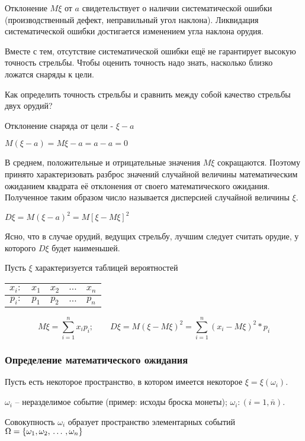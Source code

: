 \documentclass[a4paper,12pt]{report}
\begin{document}
	Отклонение $M\xi$ от $a$ свидетельствует о наличии систематической ошибки (производственный дефект, неправильный угол наклона). Ликвидация систематической ошибки достигается изменением угла наклона орудия. 

	Вместе с тем, отсутствие систематической ошибки ещё не гарантирует высокую точность стрельбы. Чтобы оценить точность надо знать, насколько близко ложатся снаряды к цели. 

	Как определить точность стрельбы и сравнить между собой качество стрельбы двух орудий?

	Отклонение снаряда от цели - $\xi - a$
	
	$M(\xi - a) = M\xi - a = a - a = 0$

	В среднем, положительные и отрицательные значения $M\xi$ сокращаются. Поэтому принято характеризовать разброс значений случайной величины математическим ожиданием квадрата её отклонения от своего математического ожидания. Полученное таким образом число называется дисперсией случайной величины $\xi$. 

	$D\xi = M(\xi-a)^2 = M[\xi-M\xi]^2$

	Ясно, что в случае орудий, ведущих стрельбу, лучшим следует считать орудие, у которого $D\xi$ будет наименьшей.

	Пусть $\xi$ характеризуется таблицей вероятностей \strut


	\begin{tabular}{|r|c|c|c|c|}
	\hline
		$x_i:$ & $x_1$ & $x_2$ & $\ldots$ & $x_n$\\
	\hline	
		$p_i:$ & $p_1$ & $p_2$ & $\ldots$ & $p_n$\\
	\hline
	\end{tabular}

	
	$$
	  M\xi = \sum^n_{i=1}x_ip_i;
	  \qquad
	  D\xi = M (\xi - M\xi)^2 
	       = \sum^n_{i=1}(x_i-M\xi)^2*p_i
	$$



\subsubsection{Определение математического ожидания}

	Пусть есть некоторое пространство, в котором имеется некоторое $\xi = \xi(\omega_i)$.

	$\omega_i$ – неразделимое событие (пример: исходы броска монеты); $\omega_i:(i=1,\bar n)$.

	Совокупность $\omega_i$ образует пространство элементарных событий
	$\Omega = \{ \omega_1, \omega_2, \,\ldots\,, \omega_n \}$
\end{document}
